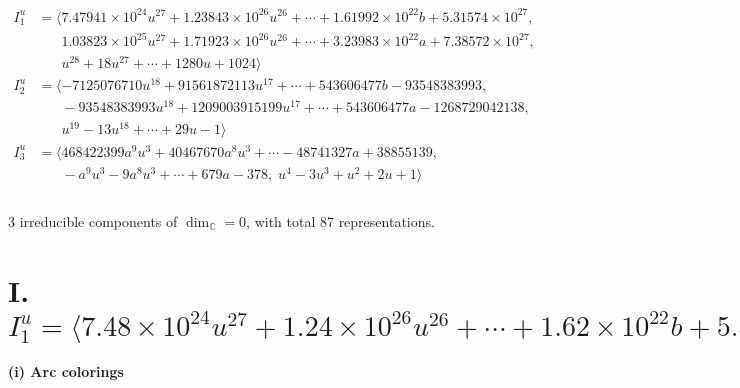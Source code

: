 \documentclass[1p]{elsarticle_modified}
\theoremstyle{definition}
\begin{document}
\begin{align*}
I^u_{1}&=\langle 
7.47941\times10^{24} u^{27}+1.23843\times10^{26} u^{26}+\cdots+1.61992\times10^{22} b+5.31574\times10^{27},\\
\phantom{I^u_{1}}&\phantom{= \langle  }1.03823\times10^{25} u^{27}+1.71923\times10^{26} u^{26}+\cdots+3.23983\times10^{22} a+7.38572\times10^{27},\\
\phantom{I^u_{1}}&\phantom{= \langle  }u^{28}+18 u^{27}+\cdots+1280 u+1024\rangle \\
I^u_{2}&=\langle 
-7125076710 u^{18}+91561872113 u^{17}+\cdots+543606477 b-93548383993,\\
\phantom{I^u_{2}}&\phantom{= \langle  }-93548383993 u^{18}+1209003915199 u^{17}+\cdots+543606477 a-1268729042138,\\
\phantom{I^u_{2}}&\phantom{= \langle  }u^{19}-13 u^{18}+\cdots+29 u-1\rangle \\
I^u_{3}&=\langle 
468422399 a^9 u^3+40467670 a^8 u^3+\cdots-48741327 a+38855139,\\
\phantom{I^u_{3}}&\phantom{= \langle  }- a^9 u^3-9 a^8 u^3+\cdots+679 a-378,\;u^4-3 u^3+u^2+2 u+1\rangle \\
\\
\end{align*}
\raggedright * 3 irreducible components of $\dim_{\mathbb{C}}=0$, with total 87 representations.\\
\newpage
\renewcommand{\arraystretch}{1}
\centering \section*{I. $I^u_{1}= \langle 7.48\times10^{24} u^{27}+1.24\times10^{26} u^{26}+\cdots+1.62\times10^{22} b+5.32\times10^{27},\;1.04\times10^{25} u^{27}+1.72\times10^{26} u^{26}+\cdots+3.24\times10^{22} a+7.39\times10^{27},\;u^{28}+18 u^{27}+\cdots+1280 u+1024 \rangle$}
\flushleft \textbf{(i) Arc colorings}\\
\end{document}
